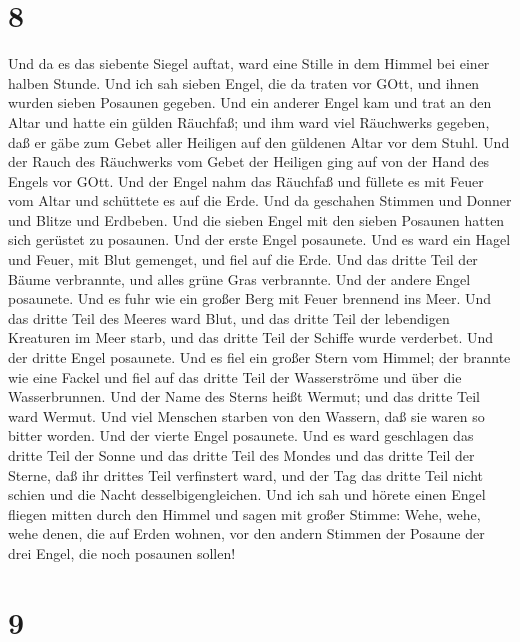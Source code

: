 \hypertarget{section-6}{%
\section{8}\label{section-6}}

 Und da es das siebente Siegel auftat, ward eine Stille in
dem Himmel bei einer halben Stunde.  Und ich sah sieben
Engel, die da traten vor GOtt, und ihnen wurden sieben Posaunen gegeben.
 Und ein anderer Engel kam und trat an den Altar und hatte
ein gülden Räuchfaß; und ihm ward viel Räuchwerks gegeben, daß er gäbe
zum Gebet aller Heiligen auf den güldenen Altar vor dem Stuhl.
 Und der Rauch des Räuchwerks vom Gebet der Heiligen ging
auf von der Hand des Engels vor GOtt.  Und der Engel nahm
das Räuchfaß und füllete es mit Feuer vom Altar und schüttete es auf die
Erde. Und da geschahen Stimmen und Donner und Blitze und Erdbeben.
 Und die sieben Engel mit den sieben Posaunen hatten sich
gerüstet zu posaunen.  Und der erste Engel posaunete. Und es
ward ein Hagel und Feuer, mit Blut gemenget, und fiel auf die Erde. Und
das dritte Teil der Bäume verbrannte, und alles grüne Gras verbrannte.
 Und der andere Engel posaunete. Und es fuhr wie ein großer
Berg mit Feuer brennend ins Meer. Und das dritte Teil des Meeres ward
Blut,  und das dritte Teil der lebendigen Kreaturen im Meer
starb, und das dritte Teil der Schiffe wurde verderbet. 
Und der dritte Engel posaunete. Und es fiel ein großer Stern vom Himmel;
der brannte wie eine Fackel und fiel auf das dritte Teil der
Wasserströme und über die Wasserbrunnen.  Und der Name des
Sterns heißt Wermut; und das dritte Teil ward Wermut. Und viel Menschen
starben von den Wassern, daß sie waren so bitter worden. 
Und der vierte Engel posaunete. Und es ward geschlagen das dritte Teil
der Sonne und das dritte Teil des Mondes und das dritte Teil der Sterne,
daß ihr drittes Teil verfinstert ward, und der Tag das dritte Teil nicht
schien und die Nacht desselbigengleichen.  Und ich sah und
hörete einen Engel fliegen mitten durch den Himmel und sagen mit großer
Stimme: Wehe, wehe, wehe denen, die auf Erden wohnen, vor den andern
Stimmen der Posaune der drei Engel, die noch posaunen sollen!

\hypertarget{section-7}{%
\section{9}\label{section-7}}

